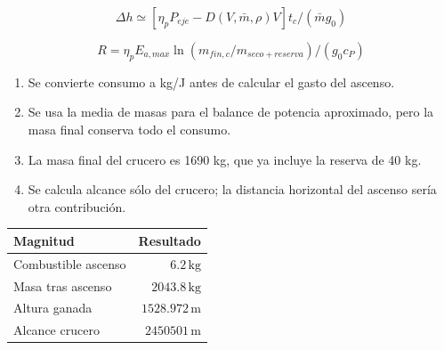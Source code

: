 \begin{equation}\Delta h\simeq[\eta_pP_{eje}-D(V,\bar m,\rho)V]t_c/(\bar m g_0)\end{equation}

\begin{equation}R=\eta_pE_{a,max}\ln(m_{fin,c}/m_{seco+reserva})/(g_0c_P)\end{equation}


\begin{enumerate}

\item Se convierte consumo a kg/J antes de calcular el gasto del ascenso.

\item Se usa la media de masas para el balance de potencia aproximado, pero la masa final conserva todo el consumo.

\item La masa final del crucero es 1690 kg, que ya incluye la reserva de 40 kg.

\item Se calcula alcance sólo del crucero; la distancia horizontal del ascenso sería otra contribución.

\end{enumerate}





\begin{center}\begin{tabular}{lr}\toprule Magnitud&Resultado\\\midrule

Combustible ascenso & $6.2\,\mathrm{kg}$\\

Masa tras ascenso & $2043.8\,\mathrm{kg}$\\

Altura ganada & $1528.972\,\mathrm m$\\

Alcance crucero & $2450501\,\mathrm m$\\

\bottomrule\end{tabular}\end{center}

